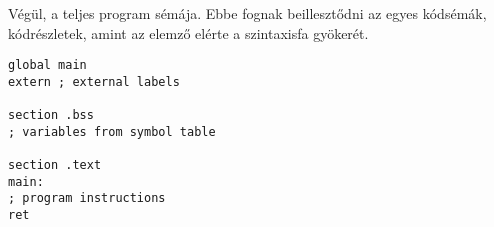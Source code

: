 Végül, a teljes program sémája. Ebbe fognak beillesztődni az egyes kódsémák, kódrészletek, amint az elemző elérte a szintaxisfa gyökerét.

\begin{lstlisting}[style=asmstyle, caption={A teljes program sémája}]
global main
extern ; external labels

section .bss
; variables from symbol table

section .text
main:
; program instructions
ret
\end{lstlisting}